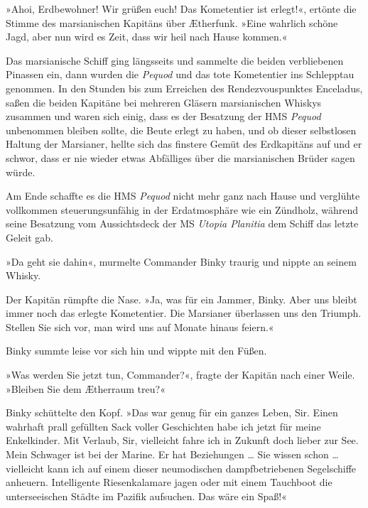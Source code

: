 »Ahoi, Erdbewohner! Wir grüßen euch! Das Kometentier ist erlegt!«,
ertönte die Stimme des marsianischen Kapitäns über Ætherfunk. »Eine
wahrlich schöne Jagd, aber nun wird es Zeit, dass wir heil nach
Hause kommen.«

Das marsianische Schiff ging längsseits und sammelte die beiden
verbliebenen Pinassen ein, dann wurden die \textit{Pequod} und das tote
Kometentier ins Schlepptau genommen. In den Stunden bis zum
Erreichen des Rendezvouspunktes Enceladus, saßen die beiden
Kapitäne bei mehreren Gläsern marsianischen Whiskys zusammen und
waren sich einig, dass es der Besatzung der HMS \textit{Pequod} unbenommen
bleiben sollte, die Beute erlegt zu haben, und ob dieser
selbstlosen Haltung der Marsianer, hellte sich das finstere Gemüt
des Erdkapitäns auf und er schwor, dass er nie wieder etwas
Abfälliges über die marsianischen Brüder sagen würde.

\bigpar

Am Ende schaffte es die HMS \textit{Pequod} nicht mehr ganz nach Hause und
verglühte vollkommen steuerungsunfähig in der Erdatmosphäre wie ein
Zündholz, während seine Besatzung vom Aussichtsdeck der MS \textit{Utopia
Planitia} dem Schiff das letzte Geleit gab.

\bigpar

»Da geht sie dahin«, murmelte Commander Binky traurig und nippte an
seinem Whisky.

Der Kapitän rümpfte die Nase. »Ja, was für ein Jammer, Binky. Aber
uns bleibt immer noch das erlegte Kometentier. Die Marsianer
überlassen uns den Triumph. Stellen Sie sich vor, man wird uns auf
Monate hinaus feiern.«

Binky summte leise vor sich hin und wippte mit den Füßen.

»Was werden Sie jetzt tun, Commander?«, fragte der Kapitän nach
einer Weile. »Bleiben Sie dem Ætherraum treu?«

Binky schüttelte den Kopf. »Das war genug für ein ganzes Leben,
Sir. Einen wahrhaft prall gefüllten Sack voller Geschichten habe
ich jetzt für meine Enkelkinder. Mit Verlaub, Sir, vielleicht fahre
ich in Zukunft doch lieber zur See. Mein Schwager ist bei der
Marine. Er hat Beziehungen \ldots{} Sie wissen schon \ldots{} vielleicht kann
ich auf einem dieser neumodischen dampfbetriebenen Segelschiffe
anheuern. Intelligente Riesenkalamare jagen oder mit einem
Tauchboot die unterseeischen Städte im Pazifik aufsuchen. Das wäre
ein Spaß!«




